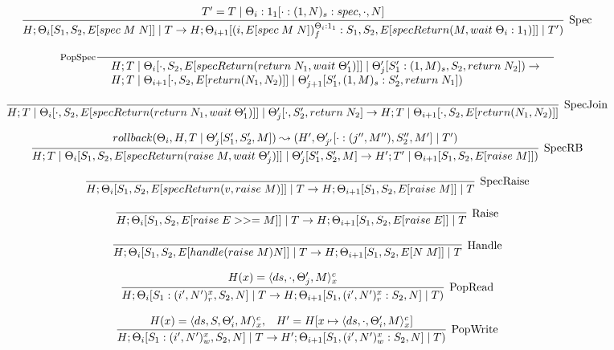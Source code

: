 \documentclass[9pt]{article}
\newcommand{\eval}[1]{E[#1]}
\begin{document}
\[ %
\infer[\text{Spec}]{H; \Theta_i[S_1, S_2, \eval{spec \; M \; N}] \; | \; T \rightarrow H; \Theta_{i+1}[(i, \eval{spec \; M \; N})_f^{\Theta_i : 1_1} : S_1, S_2, \eval{specReturn(M, wait \; \Theta_i : 1_1)}] \; | \; T')}{T' = T \; | \; \Theta_i : 1_1[\cdot : (1, N)_s : spec, \cdot, N]}
\]

\[%
\inference[\text{PopSpec}]{}{\begin{array}{l} H; T \; | \; \Theta_i[\cdot, S_2, \eval{specReturn(return \; N_1, wait \; \Theta_1')}] \; | \; \Theta_j'[S_1' : (1, M)_s, S_2, return \; N_2]) \rightarrow \\ H; T \; | \; \Theta_{i+1}[\cdot, S_2, \eval{return(N_1, N_2)}] \; | \; \Theta_{j+1}'[S_1', (1, M)_s : S_2', return \; N_1]) \end{array}}
\]

\[%
\infer[\text{SpecJoin}]{H; T \; | \; \Theta_i[\cdot, S_2, \eval{specReturn(return \; N_1, wait \; \Theta_1')}] \; | \; \Theta_j'[\cdot, S_2', return \; N_2] \rightarrow  H; T \; | \; \Theta_{i+1}[\cdot, S_2, \eval{return(N_1, N_2)}]}{}
\]

\[%
\infer[\text{SpecRB}]{H; T \; | \; \Theta_i[S_1, S_2, \eval{specReturn(raise \; M, wait \; \Theta_j')}] \; | \; \Theta_j'[S_1', S_2', M] \rightarrow H'; T' \; | \;  \Theta_{i+1}[S_1, S_2, \eval{raise \; M}])}{rollback(\Theta_i, H, T \; | \; \Theta_j'[S_1', S_2', M]) \leadsto (H', \Theta_{j'}'[\cdot : (j'', M''), S_2'', M'] \; | \; T')}
\]

\[%
\infer[\text{SpecRaise}]{H; \Theta_i[S_1, S_2, \eval{specReturn(v, raise \; M)}] \; | \; T \rightarrow H; \Theta_{i+1}[S_1, S_2, \eval{raise \; M}] \; | \; T}{}
\]

\[%
\infer[\text{Raise}]{H; \Theta_i[S_1, S_2, \eval{raise \; E >>= M}] \; | \; T \rightarrow H; \Theta_{i+1}[S_1, S_2, \eval{raise \; E}] \; | \; T}{}
\]

\[%
\infer[\text{Handle}]{H; \Theta_i[S_1, S_2, \eval{handle (raise \; M) N}] \; | \; T \rightarrow H; \Theta_{i+1}[S_1, S_2, \eval{N \; M}] \; | \; T}{}
\]

\[%
\infer[\text{PopRead}]{H; \Theta_i[S_1 : (i', N')_r^x, S_2, N] \; | \; T \rightarrow H; \Theta_{i+1}[S_1, (i', N')_r^x : S_2, N] \; | \; T)}{H(x) = \langle ds, \cdot, \Theta_j', M\rangle_x^c}
\]

\[%
\infer[\text{PopWrite}]{H; \Theta_i[S_1: (i', N')_w^x, S_2, N] \; | \; T \rightarrow H'; \Theta_{i+1}[S_1, (i', N')_w^x : S_2, N] \; | \; T)}{H(x) = \langle ds, S, \Theta_i', M\rangle_x^c, \;\;\; H' = H[x \mapsto \langle ds, \cdot, \Theta_i', M\rangle_x^c]}
\]
\end{document}
